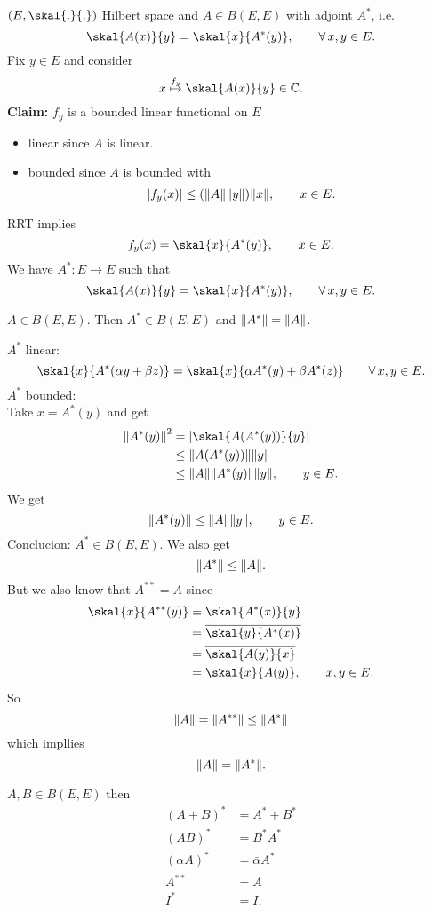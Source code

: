 $(E,\skal{.}{.})$ Hilbert space and $A \in B(E,E)$ with adjoint $A^{*}$, i.e.
\[
	\skal{A(x)}{y} = \skal{x}{A^*(y)} , \qquad \forall\, x,y \in E.
\]
Fix $y \in E$ and consider
\[
	x \stackrel{f_y}{\mapsto } \skal{A(x)}{y} \in \mathbb{C}. 
\]
\textbf{Claim:} \text{    }$f_y$ is a bounded linear functional on $E$
\begin{itemize}
	\item linear since $A$ is linear.
	\item bounded since $A$ is bounded with
	\[
		\abs{f_y(x)} \leq (\norm{A}\norm{y})\norm{x}, \qquad x \in E.
	\]
\end{itemize}
	RRT implies
	\[
		f_y(x) = \skal{x}{A^*(y)}, \qquad x \in E.
	\]
	We have $A^*: E \to E$ such that
	\[
		\skal{A(x)}{y} = \skal{x}{A^*(y)} , \qquad \forall\, x,y \in E.
	\]
\begin{proposition}
	$A \in B(E,E)$. Then $A^* \in B(E,E) $ and $\norm{A^*} = \norm{A}$.
\end{proposition}
\begin{beweis}
	$A^*$ linear:
	\[
		\skal{x}{A^* ( \alpha y + \beta z)} = \skal{x}{\alpha A^*(y) + \beta A^*(z)} \qquad \forall\, x,y \in E.
	\]
	$A^*$ bounded: \\ Take $x= A^*(y)$ and get
	\begin{align*}
		\norm{A^*(y)}^2 &= \abs{\skal{A(A^*(y))}{y}} \\
		&\leq \norm{A(A^*(y))} \norm{y} \\
		&\leq \norm{A} \norm{A^*(y)} \norm{y}, \qquad y \in E.
	\end{align*}
	We get
	\[
		\norm{A^*(y)} \leq \norm{A} \norm{y}, \qquad y \in E.
	\]
	Conclucion: $A^* \in B(E,E)$. We also get 
	\[
		\norm{A^*} \leq \norm{A}.
	\]
	But we also know that $A^{**} = A$ since
	\begin{align*}
		\skal{x}{A^{**}(y)} &= \skal{A^*(x)}{y} \\
		&= \overline{\skal{y}{A^*(x)}} \\
		&= \overline{\skal{A(y)}{x}} \\
		&= \skal{x}{A(y)}, \qquad x,y \in E.
	\end{align*}
	So \[
		\norm{A} = \norm{A^{**}} \leq \norm{A^*}
	\]
	which impllies
	\[
		\norm{A} = \norm{A^*}.
	\]
\end{beweis}
\begin{bemerkung}
	$A,B \in B(E,E)$ then
	\begin{align*}
		(A+B)^* &= A^* + B^* \\
		(AB)^* &= B^* A^* \\
		(\alpha A)^* &= \bar{\alpha}A^* \\
		A^{**} &= A \\
		I^* &= I.
	\end{align*}
\end{bemerkung}
